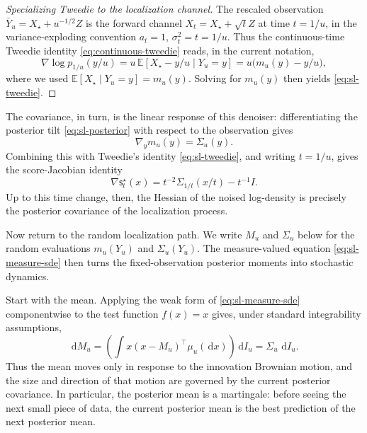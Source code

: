 \documentclass[10pt,a4paper]{amsart}
\numberwithin{equation}{section}
\newcommand{\E}{\mathbb{E}}
\newcommand{\dd}{\,\mathrm{d}}
\newcommand{\Id}{I}
\newcommand{\sstar}{\mathsf{s}^{\star}}
\begin{document}
\begin{proof}[Specializing Tweedie to the localization channel]
The rescaled observation $\bar Y_u=X_\star+u^{-1/2}Z$ is the forward channel
$X_t=X_\star+\sqrt{t}Z$ at time $t=1/u$, in the variance-exploding convention
$a_t=1$, $\sigma_t^2=t=1/u$.  Thus the continuous-time Tweedie identity
\eqref{eq:continuous-tweedie} reads, in the current notation,
\[
    \nabla\log p_{1/u}(y/u)
    =
    u\,\E[X_\star-y/u\mid Y_u=y]
    =
    u\bigl(m_u(y)-y/u\bigr),
\]
where we used $\E[X_\star\mid Y_u=y]=m_u(y)$.  Solving for $m_u(y)$ then yields
\eqref{eq:sl-tweedie}.
\end{proof}

The covariance, in turn, is the linear response of this denoiser:
differentiating the posterior tilt \eqref{eq:sl-posterior} with respect to the
observation gives
\begin{equation}\label{eq:posterior-mean-jacobian}
    \nabla_y m_u(y)=\Sigma_u(y).
\end{equation}
Combining this with Tweedie's identity \eqref{eq:sl-tweedie}, and writing
$t=1/u$, gives the score-Jacobian identity
\begin{equation}\label{eq:score-hessian-covariance}
    \nabla \sstar_t(x)
    =
    t^{-2}\Sigma_{1/t}(x/t)
    -
    t^{-1}\Id.
\end{equation}
Up to this time change, then, the Hessian of the noised log-density is precisely
the posterior covariance of the localization process.

Now return to the random localization path. We write
$M_u$ and $\Sigma_u$ below for the random evaluations
$m_u(Y_u)$ and $\Sigma_u(Y_u)$.  The measure-valued equation
\eqref{eq:sl-measure-sde} then turns the fixed-observation posterior moments
into stochastic dynamics.

Start with the mean.  Applying the weak form of
\eqref{eq:sl-measure-sde} componentwise to the test function $f(x)=x$ gives,
under standard integrability assumptions,
\begin{equation}\label{eq:sl-mean-sde}
    \dd M_u
    =
    \left(\int x(x-M_u)^\top \mu_u(\dd x)\right)\dd I_u
    =
    \Sigma_u\,\dd I_u.
\end{equation}
Thus the mean moves only in response to the innovation Brownian motion, and
the size and direction of that motion are governed by the current posterior
covariance.  In particular, the posterior mean is a martingale: before seeing
the next small piece of data, the current posterior mean is the best prediction
of the next posterior mean.
\end{document}
